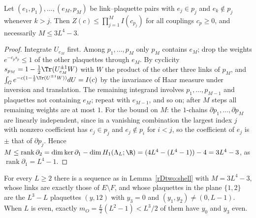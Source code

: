 \begin{lemma}[shelling]\label{rDtwo:shell}
Let $(e_1,p_1),\dots,(e_M,p_M)$ be link--plaquette pairs with $e_j\in p_j$
and $e_k\notin p_j$ whenever $k>j$. Then $Z(c)\le\prod_{j=1}^MI(c_{p_j})$
for all couplings $c_p\ge0$, and necessarily $M\le3L^4-3$.
\end{lemma}

\begin{proof}
Integrate $U_{e_M}$ first. Among $p_1,\dots,p_M$ only $p_M$ contains $e_M$;
drop the weights $e^{-c_ps_p}\le1$ of the other plaquettes through $e_M$. By
cyclicity $s_{p_M}=1-\frac12\Tr(U_{e_M}^{\pm1}W)$ with $W$ the product of the
other three links of $p_M$, and $\int_Ge^{-c(1-\frac12\Tr(U^{\pm1}W))}dU=I(c)$
by the invariance of Haar measure under inversion and translation. The
remaining integrand involves $p_1,\dots,p_{M-1}$ and plaquettes not
containing $e_M$; repeat with $e_{M-1}$, and so on; after $M$ steps all
remaining weights are at most $1$. For the bound on $M$: the $1$-chains
$\partial p_1,\dots,\partial p_M$ are linearly independent, since in a
vanishing combination the largest index $j$ with nonzero coefficient has
$e_j\in p_j$ and $e_j\notin p_i$ for $i<j$, so the coefficient of $e_j$ is
$\pm$ that of $\partial p_j$. Hence $M\le\operatorname{rank}\partial_2=\dim
\ker\partial_1-\dim H_1(\Lambda_L;\R)=(4L^4-(L^4-1))-4=3L^4-3$, as
$\operatorname{rank}\partial_1=L^4-1$.
\end{proof}

\begin{lemma}\label{rDtwo:shellexplicit}
For every $L\ge2$ there is a sequence as in Lemma~\ref{rDtwo:shell} with
$M=3L^4-3$, whose links are exactly those of $E\setminus F$, and whose
plaquettes in the plane $\{1,2\}$ are the $L^3-L$ plaquettes $(y,12)$ with
$y_3=0$ and $(y_1,y_2)\ne(0,L-1)$. When $L$ is even, exactly
$m_O=\frac L2(L^2-1)<L^3/2$ of them have $y_0$ and $y_3$ even.
\end{lemma}

